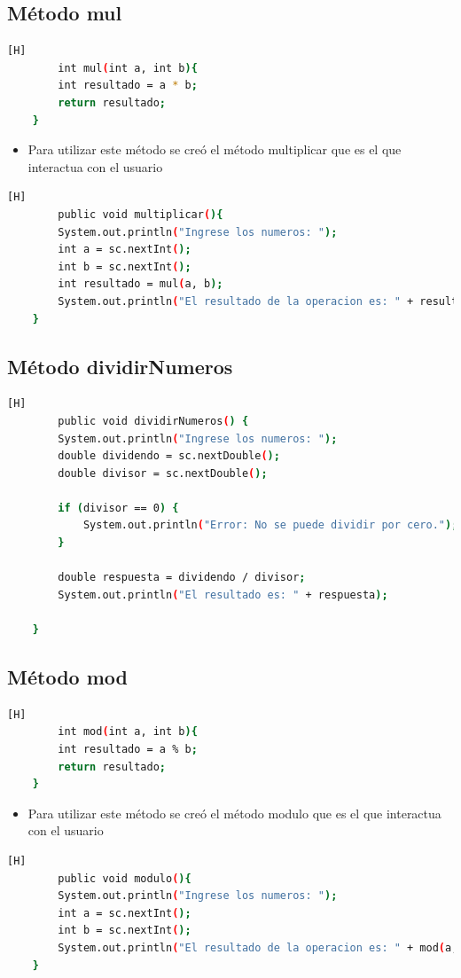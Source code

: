 \documentclass{article}
\begin{document}
	\subsection{Método mul}
	\begin{lstlisting}[language=bash,caption={Código del método mul}][H]
		int mul(int a, int b){ 
        int resultado = a * b;
        return resultado; 
    }	
	\end{lstlisting}
	\begin{itemize}
		\item  Para utilizar este método se creó el método multiplicar que es el que interactua con el usuario
	\end{itemize}
	\begin{lstlisting}[language=bash,caption={Código del método multiplicar}][H]
		public void multiplicar(){
        System.out.println("Ingrese los numeros: ");
        int a = sc.nextInt();
        int b = sc.nextInt();
        int resultado = mul(a, b);
        System.out.println("El resultado de la operacion es: " + resultado);
    }
	\end{lstlisting}
	\subsection{Método dividirNumeros}
	\begin{lstlisting}[language=bash,caption={Código del método dividirNumeros}][H]
		public void dividirNumeros() {
        System.out.println("Ingrese los numeros: ");
        double dividendo = sc.nextDouble();
        double divisor = sc.nextDouble();

        if (divisor == 0) {
            System.out.println("Error: No se puede dividir por cero.");
        }

        double respuesta = dividendo / divisor;
        System.out.println("El resultado es: " + respuesta);
 
    }
	\end{lstlisting}
	\subsection{Método mod}
	\begin{lstlisting}[language=bash,caption={Código del método mod}][H]
		int mod(int a, int b){
        int resultado = a % b;
        return resultado; 
    }
	\end{lstlisting}
	\begin{itemize}
		\item  Para utilizar este método se creó el método modulo que es el que interactua con el usuario
	\end{itemize}
	\begin{lstlisting}[language=bash,caption={Código del método modulo}][H]
		public void modulo(){
        System.out.println("Ingrese los numeros: ");
        int a = sc.nextInt();
        int b = sc.nextInt();
        System.out.println("El resultado de la operacion es: " + mod(a, b));
    }
	\end{lstlisting}
\end{document}
